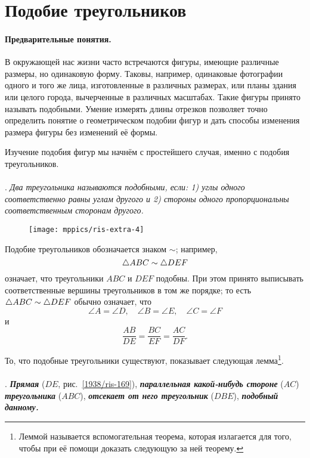 \section{Подобие треугольников}

\paragraph{Предварительные понятия.}\label{1938/156}
В окружающей нас жизни часто встречаются фигуры, имеющие различные размеры, но одинаковую форму.
Таковы, например, одинаковые фотографии одного и того же лица, изготовленные в различных размерах, или планы здания или целого города, вычерченные в различных масштабах. 
Такие фигуры принято называть подобными.
Умение измерять длины отрезков позволяет точно определить понятие о геометрическом подобии фигур и дать способы изменения размера фигуры без изменений её формы.

Изучение подобия фигур мы начнём с простейшего случая, именно с подобия треугольников.

\paragraph{}\label{1938/158}
.
\emph{Два треугольника называются подобными, если:
1) углы одного соответственно равны углам другого и 
2) стороны одного пропорциональны соответственным сторонам другого.}

\begin{wrapfigure}{r}{51mm}
\centering
\texttt{[image: mppics/ris-extra-4]}
\caption{}\label{extra/ris-4}
\end{wrapfigure}

Подобие треугольников обозначается знаком $\sim$;
например,
\[\triangle ABC\z\sim \triangle DEF\]
означает, что треугольники $ABC$ и $DEF$ подобны.
При этом принято выписывать соответственные вершины треугольников в том же порядке;
то есть  $\triangle ABC\z\sim \triangle DEF$ обычно означает, что 
\[\angle A=\angle D,\quad
 \angle B=\angle E,\quad
 \angle C=\angle F
\]
и
\[\frac{AB}{DE}=\frac{BC}{EF}=\frac{AC}{DF}.\]

То, что подобные треугольники существуют, показывает следующая лемма\footnote{Леммой называется вспомогательная теорема, которая излагается для того, чтобы при её помощи доказать следующую за ней теорему.}.

\paragraph{}\label{1938/159}
.
\textbf{\emph{Прямая}} ($DE$, рис.~\ref{1938/ris-169}), \textbf{\emph{параллельная какой-нибудь стороне}} ($AC$) \textbf{\emph{треугольника}} ($ABC$), \textbf{\emph{отсекает от него треугольник}} ($DBE$), \textbf{\emph{подобный данному.}}

